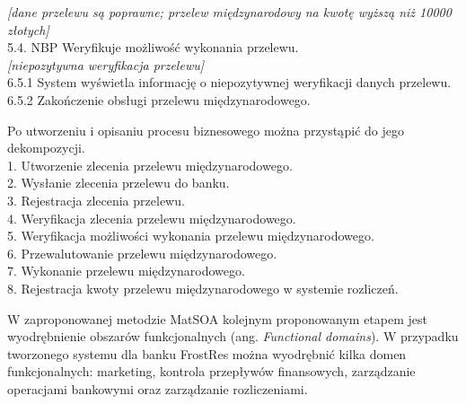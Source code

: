 \begin{flushleft}
\textit{{[}dane przelewu są poprawne; przelew międzynarodowy na kwotę wyższą niż 10000 złotych{]}}\\
\hspace{1ex}5.4. NBP Weryfikuje możliwość wykonania przelewu.\\
\hspace{1ex}\textit{{[}niepozytywna weryfikacja przelewu{]}}\\
\hspace{2ex}6.5.1 System wyświetla informację o niepozytywnej weryfikacji danych przelewu.\\
\hspace{2ex}6.5.2 Zakończenie obsługi przelewu międzynarodowego.\\ 
\end{flushleft}

\begin{flushleft}
Po utworzeniu i opisaniu procesu biznesowego można przystąpić do jego dekompozycji. \\
\hspace{1ex}1. Utworzenie zlecenia przelewu międzynarodowego.\\
\hspace{1ex}2. Wysłanie zlecenia przelewu do banku.\\
\hspace{1ex}3. Rejestracja zlecenia przelewu.\\
\hspace{1ex}4. Weryfikacja zlecenia przelewu międzynarodowego.\\
\hspace{1ex}5. Weryfikacja możliwości wykonania przelewu międzynarodowego.\\
\hspace{1ex}6. Przewalutowanie przelewu międzynarodowego.\\
\hspace{1ex}7. Wykonanie przelewu międzynarodowego.\\
\hspace{1ex}8. Rejestracja kwoty przelewu międzynarodowego w systemie rozliczeń.\\
\end{flushleft}

W zaproponowanej metodzie MatSOA kolejnym proponowanym etapem jest wyodrębnienie obszarów funkcjonalnych (ang. \emph{Functional domains}). W przypadku tworzonego systemu dla banku FrostRes można wyodrębnić kilka domen funkcjonalnych: marketing, kontrola przepływów finansowych, zarządzanie operacjami bankowymi oraz zarządzanie rozliczeniami. 

